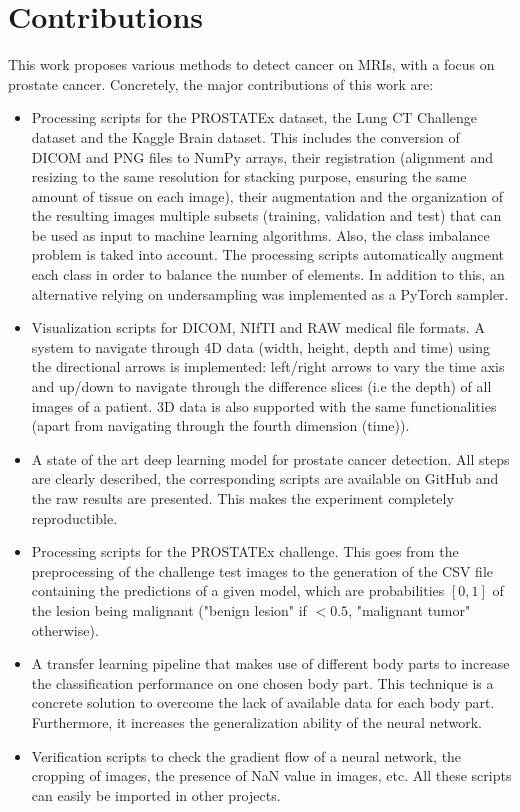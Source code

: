 \section{Contributions}
This work proposes various methods to detect cancer on MRIs, with a focus on prostate cancer. Concretely, the major contributions of this work are:
\begin{itemize}

\item Processing scripts for the PROSTATEx dataset, the Lung CT Challenge dataset and the Kaggle Brain dataset. This includes the conversion of DICOM and PNG files to NumPy arrays, their registration (alignment and resizing to the same resolution for stacking purpose, ensuring the same amount of tissue on each image), their augmentation and the organization of the resulting images multiple subsets (training, validation and test) that can be used as input to machine learning algorithms. Also, the class imbalance problem is taked into account. The processing scripts automatically augment each class in order to balance the number of elements. In addition to this, an alternative relying on undersampling was implemented as a PyTorch sampler.

\item Visualization scripts for DICOM, NIfTI and RAW medical file formats. A system to navigate through 4D data (width, height, depth and time) using the directional arrows is implemented: left/right arrows to vary the time axis and up/down to navigate through the difference slices (i.e the depth) of all images of a patient. 3D data is also supported with the same functionalities (apart from navigating through the fourth dimension (time)). 

\item A state of the art deep learning model for prostate cancer detection. All steps are clearly described, the corresponding scripts are available on GitHub and the raw results are presented. This makes the experiment completely reproductible. 

\item Processing scripts for the PROSTATEx challenge. This goes from the preprocessing of the challenge test images to the generation of the CSV file containing the predictions of a given model, which are probabilities $[0,1]$ of the lesion being malignant ("benign lesion" if $< 0.5$, "malignant tumor" otherwise).

\item A transfer learning pipeline that makes use of different body parts to increase the classification performance on one chosen body part. This technique is a concrete solution to overcome the lack of available data for each body part. Furthermore, it increases the generalization ability of the neural network.

\item Verification scripts to check the gradient flow of a neural network, the cropping of images, the presence of NaN value in images, etc. All these scripts can easily be imported in other projects.
\end{itemize}
